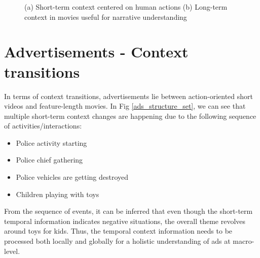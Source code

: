 \begin{figure}[h!]
\centering
{}
\caption{(a) Short-term context centered on human actions (b) Long-term context in movies useful for narrative understanding}
\label{short term and long term context}
\end{figure}

\section{Advertisements - Context transitions}

In terms of context transitions, advertisements lie between action-oriented short videos and feature-length movies. In Fig \ref{ads_structure_set}, we can see that multiple short-term context changes are happening due to the following sequence of activities/interactions:
\begin{itemize}
\item Police activity starting
\item Police chief gathering 
\item Police vehicles are getting destroyed
\item Children playing with toys 
\end{itemize}
From the sequence of events, it can be inferred that even though the short-term temporal information indicates negative situations, the overall theme revolves around toys for kids.
Thus, the temporal context information needs to be processed both locally and globally for a holistic understanding of ads at macro-level. 


